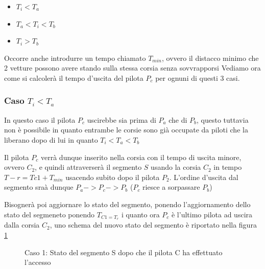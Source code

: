 \documentclass[a4paper,11pt, twoside]{book}
\begin{document}
	\begin{itemize}
	 \item $T_i < T_a$
	 \item $T_a < T_i < T_b$
	 \item $T_i > T_b$
	\end{itemize}
	
	Occorre anche introdurre un tempo chiamato $T_{min}$, ovvero il distacco minimo che 2 vetture possono avere
	stando sulla stessa corsia senza sovvrapporsi
	Vediamo ora come si calcolerà il tempo d'uscita del pilota $P_c$ per ognuni di questi 3 casi.
	
	
	\subsubsection{Caso $T_i < T_a$}
	  In questo caso il pilota $P_c$ uscirebbe sia prima di $P_a$ che di $P_b$, questo tuttavia non è possibile in quanto
	  entrambe le corsie sono già occupate da piloti che la liberano dopo di lui in quanto $T_i < T_a < T_b$
	  
	  Il pilota $P_{c}$ verrà dunque inserito nella corsia con il tempo di uscita minore, ovvero $C_2$,
	  e quindi attraverserà il segmento $S$ usando la corsia $C_2$ in tempo $T-r = T{c1} + T_{min}$
	  usacendo subito dopo il pilota $P_2$. L'ordine d'uscita dal segmento sraà dunque $P_a -> P_c -> P_b$
	  ($P_c$ riesce a sorpassare $P_b$)
	  
	  Bisognerà poi aggiornare lo stato del segmento, ponendo l'aggiornamento dello stato del segmeneto ponendo
	  $T_{C1 = T_r}$ i quanto ora $P_c$ è l'ultimo pilota ad uscira dalla corsia $C_2$, uno schema del
	  nuovo stato del segmento è riportato nella figura \ref{fgr:AccessoSegmentiCaso1}
	  
	  \begin{figure}[h]
	    \centering
	    \caption{Caso 1: Stato del segmento S dopo che il pilota C ha effettuato l'accesso}
	    \label{fgr:AccessoSegmentiCaso1}
	  \end{figure}
	  
\end{document}
